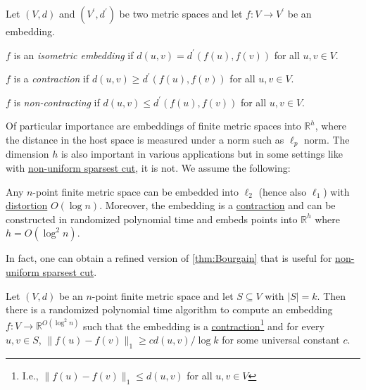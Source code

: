 \begin{definition*}
	Let \((V, d)\) and \((V^{\prime} , d^{\prime} )\) be two metric spaces and let \(f \colon V \to V^{\prime} \) be an embedding.
	\begin{definition}\label{def:isometric-embedding}
		\(f\) is an \emph{isometric embedding} if \(d(u, v) = d^{\prime} (f(u), f(v))\) for all \(u, v \in V\).
	\end{definition}
	\begin{definition}[Contraction]\label{def:contraction}
		\(f\) is a \emph{contraction} if \(d(u, v) \geq d^{\prime} (f(u), f(v))\) for all \(u, v \in V\).
	\end{definition}
	\begin{definition}\label{def:non-contracting}
		\(f\) is \emph{non-contracting} if \(d(u, v) \leq d^{\prime} (f(u), f(v))\) for all \(u, v \in V\).
	\end{definition}
\end{definition*}

Of particular importance are embeddings of finite metric spaces into \(\mathbb{R} ^h\), where the distance in the host space is measured under a norm such as \(\ell _p\) norm. The dimension \(h\) is also important in various applications but in some settings like with \hyperref[prb:non-uniform-sparsest-cut]{non-uniform sparsest cut}, it is not. We assume the following:

\begin{theorem}[Bourgain]\label{thm:Bourgain}
	Any \(n\)-point finite metric space can be embedded into \(\ell _2\) (hence also \(\ell _1\)) with \hyperref[def:distortion]{distortion} \(O(\log n)\). Moreover, the embedding is a \hyperref[def:contraction]{contraction} and can be constructed in randomized polynomial time and embeds points into \(\mathbb{R} ^h\) where \(h = O(\log ^2 n)\).
\end{theorem}

In fact, one can obtain a refined version of \autoref{thm:Bourgain} that is useful for \hyperref[prb:non-uniform-sparsest-cut]{non-uniform sparsest cut}.

\begin{theorem}[Bourgain]\label{thm:Borugain*}
	Let \((V, d)\) be an \(n\)-point finite metric space and let \(S \subseteq V\) with \(\lvert S \rvert = k\). Then there is a randomized polynomial time algorithm to compute an embedding \(f \colon V \to \mathbb{R} ^{O(\log ^2 n)}\) such that the embedding is a \hyperref[def:contraction]{contraction}\footnote{I.e., \(\lVert f(u) - f(v) \rVert _1 \leq d(u, v)\) for all \(u, v \in V\)} and for every \(u, v \in S\), \(\lVert f(u) - f(v) \rVert _1 \geq c d(u, v) / \log k\) for some universal constant \(c\).
\end{theorem}


